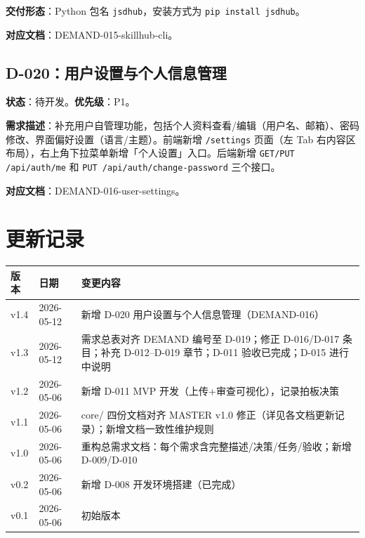 \documentclass[11pt,a4paper]{article}
\begin{document}
\textbf{交付形态}：Python 包名 \texttt{jsdhub}，安装方式为 \texttt{pip install jsdhub}。

\textbf{对应文档}：DEMAND-015-skillhub-cli。

\subsection{D-020：用户设置与个人信息管理}

\textbf{状态}：待开发。\textbf{优先级}：\textcolor{warning}{P1}。

\textbf{需求描述}：补充用户自管理功能，包括个人资料查看/编辑（用户名、邮箱）、密码修改、界面偏好设置（语言/主题）。前端新增 \texttt{/settings} 页面（左 Tab 右内容区布局），右上角下拉菜单新增「个人设置」入口。后端新增 \texttt{GET/PUT /api/auth/me} 和 \texttt{PUT /api/auth/change-password} 三个接口。

\textbf{对应文档}：DEMAND-016-user-settings。

\section*{更新记录}

\begin{tabular}{lll}
\toprule
版本 & 日期 & 变更内容 \\
\midrule
v1.4 & 2026-05-12 & 新增 D-020 用户设置与个人信息管理（DEMAND-016）\\
\midrule
v1.3 & 2026-05-12 & 需求总表对齐 DEMAND 编号至 D-019；修正 D-016/D-017 条目；补充 D-012--D-019 章节；D-011 验收已完成；D-015 进行中说明 \\
v1.2 & 2026-05-06 & 新增 D-011 MVP 开发（上传+审查可视化），记录拍板决策 \\
v1.1 & 2026-05-06 & core/ 四份文档对齐 MASTER v1.0 修正（详见各文档更新记录）；新增文档一致性维护规则 \\
v1.0 & 2026-05-06 & 重构总需求文档：每个需求含完整描述/决策/任务/验收；新增 D-009/D-010 \\
v0.2 & 2026-05-06 & 新增 D-008 开发环境搭建（已完成） \\
v0.1 & 2026-05-06 & 初始版本 \\
\bottomrule
\end{tabular}
\end{document}
